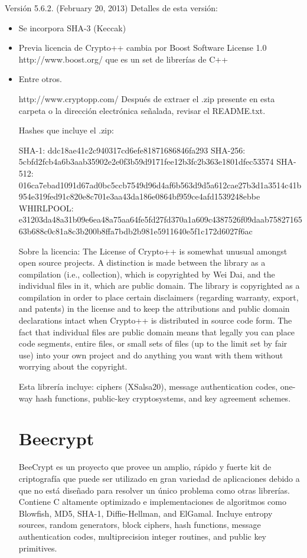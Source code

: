 \documentclass[spanish]{article}
\begin{document}
Versión 5.6.2. (February 20, 2013)
Detalles de esta versión:
\begin{itemize}
\item Se incorpora SHA-3 (Keccak)
\item Previa licencia de Crypto++ cambia por Boost Software License 1.0 http://www.boost.org/ que es un set de librerías de C++
\item Entre otros.

http://www.cryptopp.com/ 
Después de extraer el .zip presente en esta carpeta o la dirección electrónica señalada, revisar el README.txt.

Hashes que incluye el .zip:

SHA-1: ddc18ae41c2c940317cd6efe81871686846fa293
SHA-256: 5cbfd2fcb4a6b3aab35902e2e0f3b59d9171fee12b3fc2b363e1801dfec53574
SHA-512: 016ca7ebad1091d67ad0bc5ccb7549d96d4af6b563d9d5a612cae27b3d1a3514c41b954e319fed91c820e8c701e3aa43da186e0864bf959ce4afd1539248ebbe
WHIRLPOOL: e31203da48a31b09e6ea48a75aa64fe5fd27fd370a1a609c4387526f09daab7582716563b688c0c81a8c3b200b8ffa7bdb2b981e5911640e5f1c172d6027f6ac


Sobre la licencia:
The License of Crypto++ is somewhat unusual amongst open source projects. A distinction is made between the library as a compilation (i.e., collection), which is copyrighted by Wei Dai, and the individual files in it, which are public domain.
The library is copyrighted as a compilation in order to place certain disclaimers (regarding warranty, export, and patents) in the license and to keep the attributions and public domain declarations intact when Crypto++ is distributed in source code form. The fact that individual files are public domain means that legally you can place code segments, entire files, or small sets of files (up to the limit set by fair use) into your own project and do anything you want with them without worrying about the copyright.

Esta librería incluye: ciphers (XSalsa20), message authentication codes, one-way hash functions, public-key cryptosystems, and key agreement schemes.


\section{Beecrypt}
BeeCrypt es un proyecto que provee un amplio, rápido y fuerte kit de criptografía que puede ser utilizado en gran variedad de aplicaciones debido a que no está diseñado para resolver un único problema como otras librerías. Contiene C altamente optimizado e implementaciones de algoritmos como Blowfish, MD5, SHA-1, Diffie-Hellman, and ElGamal. Incluye entropy sources, random generators, block ciphers, hash functions, message authentication codes, multiprecision integer routines, and public key primitives.


\end{itemize}
\end{document}
